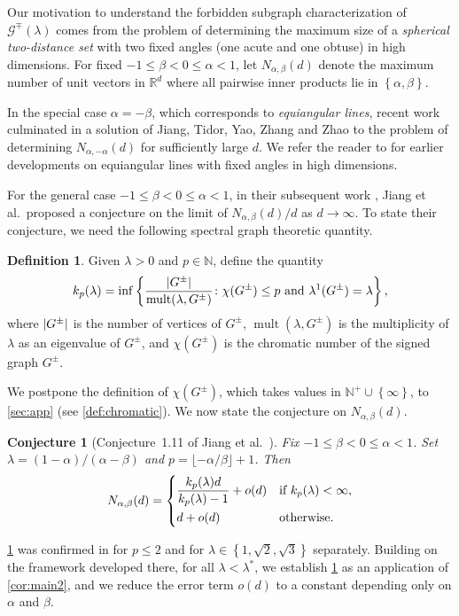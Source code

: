 \documentclass[11pt]{article}
\newtheorem{conjecture}[theorem]{Conjecture}
\theoremstyle{definition}
\newtheorem{definition}[theorem]{Definition}
\theoremstyle{remark}
\DeclarePairedDelimiter\abs{\lvert}{\rvert}
\newcommand{\dset}[2]{\left\{{#1}\colon{#2}\right\}}
\newcommand{\sset}[1]{\left\{{#1}\right\}}
\newcommand{\al}{\alpha}
\newcommand{\be}{\beta}
\newcommand{\la}{\lambda}
\newcommand{\kpl}{k_p(\la)}
\newcommand{\G}{\mathcal{G}}
\newcommand{\N}{\mathbb{N}}
\newcommand{\R}{\mathbb{R}}
\newcommand{\Gsp}{\G^\mp(\la)}
\newcommand{\Nabd}{N_{\al,\be}(d)}
\newcommand{\mult}{\operatorname{mult}}
\begin{document}
Our motivation to understand the forbidden subgraph characterization of $\Gsp$ comes from the problem of determining the maximum size of a \emph{spherical two-distance set} with two fixed angles (one acute and one obtuse) in high dimensions. For fixed $-1 \le \be < 0 \le \al < 1$, let $\Nabd$ denote the maximum number of unit vectors in $\R^d$ where all pairwise inner products lie in $\sset{\al,\be}$.

In the special case $\al = -\be$, which corresponds to \emph{equiangular lines}, recent work \cite{B16,BDSK18,JP20} culminated in a solution \cite{JTYZZ19} of Jiang, Tidor, Yao, Zhang and Zhao to the problem of determining $N_{\al, -\al}(d)$ for sufficiently large $d$. We refer the reader to \cite[Section~1]{JTYZZ19} for earlier developments on equiangular lines with fixed angles in high dimensions.

For the general case $-1 \le \be < 0 \le \al < 1$, in their subsequent work \cite{JTYZZ23}, Jiang et al.\ proposed a conjecture on the limit of $\Nabd/d$ as $d\to\infty$. To state their conjecture, we need the following spectral graph theoretic quantity.

\begin{definition}
    Given $\la > 0$ and $p \in \N$, define the quantity
    \[
        \kpl = \inf\dset{\frac{\abs{G^\pm}}{\mult(\la, G^\pm)}}{\chi(G^\pm) \le p \text{ and }\la^1(G^\pm) = \la},
    \]
    where $\abs{G^\pm}$ is the number of vertices of $G^\pm$, $\mult(\la, G^\pm)$ is the multiplicity of $\la$ as an eigenvalue of $G^\pm$, and $\chi(G^\pm)$ is the chromatic number of the signed graph $G^\pm$.
\end{definition}

We postpone the definition of $\chi(G^\pm)$, which takes values in $\N^+ \cup \sset{\infty}$, to \cref{sec:app} (see \cref{def:chromatic}). We now state the conjecture on $\Nabd$.

\begin{conjecture}[Conjecture~1.11 of Jiang et al.~\cite{JTYZZ23}] \label{conj:main}
    Fix $-1 \le \be < 0 \le \al < 1$. Set $\la = (1-\al)/(\al - \be)$ and $p = \lfloor -\al/\be \rfloor + 1$. Then
    \[
        \Nabd = \begin{dcases}
            \frac{\kpl d}{\kpl-1} + o(d) & \text{if }\kpl < \infty, \\
            d + o(d) & \text{otherwise}.
        \end{dcases}
    \]
\end{conjecture}

\cref{conj:main} was confirmed in \cite{JTYZZ23} for $p \le 2$ and for $\la \in \sset{1,\sqrt2, \sqrt3}$ separately. Building on the framework developed there, for all $\la < \la^*$, we establish \cref{conj:main} as an application of \cref{cor:main2}, and we reduce the error term $o(d)$ to a constant depending only on $\al$ and $\be$.
\end{document}
